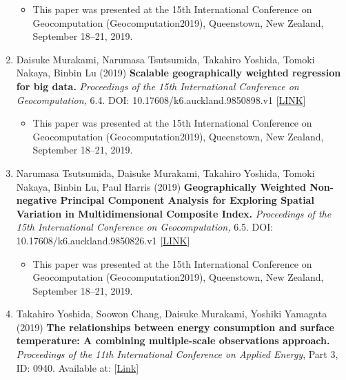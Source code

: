 \documentclass[]{book}
\providecommand{\tightlist}{%
  \setlength{\itemsep}{0pt}\setlength{\parskip}{0pt}}
\begin{document}
\begin{enumerate}
  \begin{itemize}
  \tightlist
  \item
    This paper was presented at the 15th International Conference on Geocomputation (Geocomputation2019), Queenstown, New Zealand, September 18--21, 2019.
  \end{itemize}
\item
  Daisuke Murakami, Narumasa Tsutsumida, Takahiro Yoshida, Tomoki Nakaya, Binbin Lu (2019)
  \textbf{Scalable geographically weighted regression for big data.}
  \emph{Proceedings of the 15th International Conference on Geocomputation,} 6.4.
  DOI: 10.17608/k6.auckland.9850898.v1 {[}\href{https://doi.org/10.17608/k6.auckland.9850898.v1}{LINK}{]}

  \begin{itemize}
  \tightlist
  \item
    This paper was presented at the 15th International Conference on Geocomputation (Geocomputation2019), Queenstown, New Zealand, September 18--21, 2019.
  \end{itemize}
\item
  Narumasa Tsutsumida, Daisuke Murakami, Takahiro Yoshida, Tomoki Nakaya, Binbin Lu, Paul Harris (2019)
  \textbf{Geographically Weighted Non-negative Principal Component Analysis for Exploring Spatial Variation in Multidimensional Composite Index.}
  \emph{Proceedings of the 15th International Conference on Geocomputation,} 6.5.
  DOI: 10.17608/k6.auckland.9850826.v1 {[}\href{https://doi.org/10.17608/k6.auckland.9850826.v1}{LINK}{]}

  \begin{itemize}
  \tightlist
  \item
    This paper was presented at the 15th International Conference on Geocomputation (Geocomputation2019), Queenstown, New Zealand, September 18--21, 2019.
  \end{itemize}
\item
  Takahiro Yoshida, Soowon Chang, Daisuke Murakami, Yoshiki Yamagata (2019)
  \textbf{The relationships between energy consumption and surface temperature: A combining multiple-scale observations approach.}
  \emph{Proceedings of the 11th International Conference on Applied Energy}, Part 3, ID: 0940.
  Available at: {[}\href{http://www.energy-proceedings.org/the-relationship-between-energy-consumption-and-surface-temperature-combining-multiple-scale-observations/}{Link}{]}


\end{enumerate}
\end{document}
